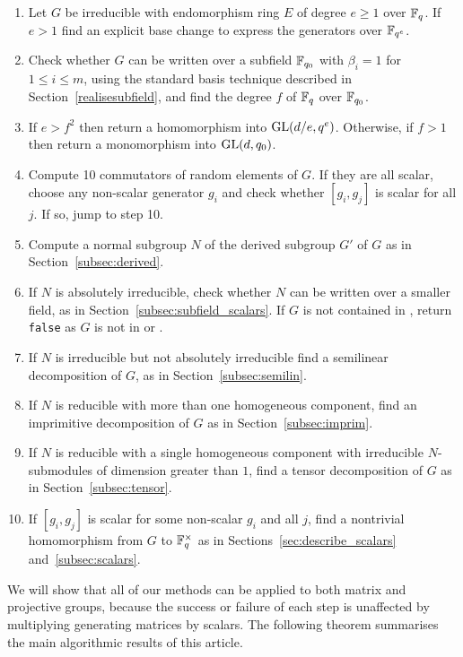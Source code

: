 \begin{enumerate}
\item Let $G$ be irreducible with endomorphism ring $E$ of degree $e
\geq 1$ over $\mathbb{F}_q$. If $e > 1$ find an explicit base change to express
the generators over $\mathbb{F}_{q^e}$.
\item Check whether $G$ can be written over 
a subfield $\mathbb{F}_{q_0}$ with $\beta_i = 1$ for $1 \leq i \leq m$, 
using the standard basis 
technique described in Section~\ref{realisesubfield}, and find the
degree $f$ of $\mathbb{F}_q$ over  $\mathbb{F}_{q_0}$.
\item If $e > f^2$ then  return a homomorphism into $\GL(d/e, q^e)$. 
Otherwise, if $f > 1$ then return a monomorphism into $\GL(d, q_0)$.
\item Compute 10 commutators of random elements of $G$. If they are all 
scalar, choose any non-scalar generator $g_i$  and check whether 
$[g_i, g_j]$ is scalar for all $j$. If so, 
jump to step 10. 
\item Compute a normal subgroup $N$ of the derived 
subgroup $G'$ of $G$ as in Section~\ref{subsec:derived}. 
\item If $N$ is absolutely irreducible, check 
whether $N$ can be written over a smaller field, as in
 Section~\ref{subsec:subfield_scalars}. If $G$ is not contained in
, return {\tt false} as $G$ is not in  or .
\item If $N$ is irreducible but not absolutely 
irreducible find a semilinear decomposition 
of $G$, as in Section~\ref{subsec:semilin}.
\item If $N$ is reducible with more than one 
homogeneous component, find an imprimitive 
decomposition of $G$ as in  
Section~\ref{subsec:imprim}.
\item If $N$ is reducible with a single 
homogeneous component with irreducible $N$-submodules of
dimension greater than $1$, find a tensor
decomposition of $G$ as in
Section~\ref{subsec:tensor}. 
\item If $[g_i, g_j]$ is scalar for some non-scalar $g_i$ and all $j$, find 
a nontrivial homomorphism from $G$ to $\mathbb{F}_q^\times$ as in
 Sections~\ref{sec:describe_scalars} and~\ref{subsec:scalars}. 
\end{enumerate}


We will show that all of our methods
can be applied to both matrix and projective groups, 
because the success or failure of each step is unaffected 
by multiplying generating matrices by scalars. 
The following theorem summarises the main 
algorithmic results of this article.

